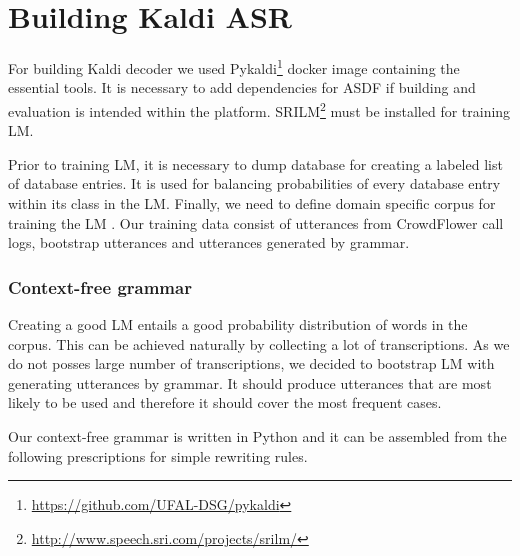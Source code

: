 \section{Building Kaldi \acs{ASR}}

For building Kaldi decoder we used Pykaldi\footnote{\url{https://github.com/UFAL-DSG/pykaldi}} docker image containing the essential tools.
It is necessary to add dependencies for \ac{ASDF} if building and evaluation is intended within the platform.
\ac{SRILM}\footnote{\url{http://www.speech.sri.com/projects/srilm/}} must be installed for training \acf{LM}.


Prior to training \ac{LM}, it is necessary to dump database for creating a labeled list of database entries. %
It is used for balancing probabilities of every database entry within its class in the \ac{LM}.
Finally, we need to define domain specific corpus for training the \ac{LM} .
Our training data consist of utterances from CrowdFlower call logs, bootstrap utterances and utterances generated by grammar.

\subsubsection{Context-free grammar}

Creating a good \ac{LM} entails a good probability distribution of words in the corpus.
This can be achieved naturally by collecting a lot of transcriptions.
As we do not posses large number of transcriptions, we decided to bootstrap \ac{LM} with generating utterances by grammar.
It should produce utterances that are most likely to be used and therefore it should cover the most frequent cases. %

Our context-free grammar is written in Python and it can be assembled from the following prescriptions for simple rewriting rules.

